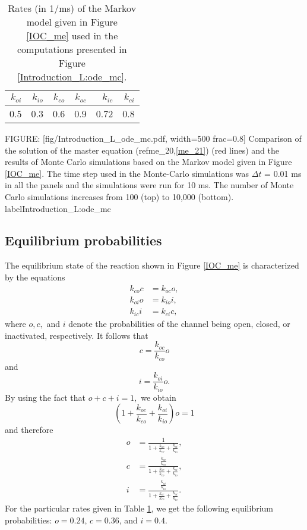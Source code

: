 \begin{table}  \begin{center}
\begin{tabular}{|r|r|r|r|r|r|} \hline
$k_{oi}$ & $k_{io}$ & $k_{co}$ & $k_{oc}$ & $k_{ic}$ &$k_{ci}$  \\ \hline
0.5  &    0.3 &   0.6   &  0.9  &   0.72  & 0.8 \\ \hline
\end{tabular} \end{center}
\caption{Rates (in 1/ms) of the Markov model given in Figure  \ref{IOC_me} used in the computations presented in Figure \ref{Introduction_L:ode_mc}.}
 \label{tab:const3x3}  \end{table}



FIGURE: [fig/Introduction_L_ode_mc.pdf, width=500 frac=0.8]  Comparison of the solution of the master equation (ref{me_20},\ref{me_21}) (red lines) and the results of Monte Carlo simulations based on the Markov model given in Figure \ref{IOC_me}. The time step used in the Monte-Carlo simulations was $\Delta t$ = 0.01 ms in all the panels and the simulations were run for 10 ms. The number of Monte Carlo simulations increases from 100 (top) to 10,000 (bottom). label{Introduction_L:ode_mc}


\subsection{Equilibrium probabilities}
\label{eq_prob_ioc}

The equilibrium state of the
reaction shown in Figure  \ref{IOC_me} is characterized by the equations
\begin{align}
k_{co}c  &  =k_{oc}o, \nonumber\\
k_{oi}o  &  =k_{io}i, \label{me_eq_20}\\
k_{ic}i  &  =k_{ci}c, \nonumber
\end{align}
where $o,c,$ and $i$ denote the probabilities of the channel being open,
closed, or inactivated, respectively. It follows that
\[
c=\frac{k_{oc}}{k_{co}}o
\]
and
\[
i=\frac{k_{oi}}{k_{io}}o.
\]
By using the fact that $o+c+i=1,$ we obtain
\[
\left(  1+\frac{k_{oc}}{k_{co}}+\frac{k_{oi}}{k_{io}}\right)  o=1
\]
and therefore
\begin{align*}
o  &  =\frac{1}{1+\frac{k_{oc}}{k_{co}}+\frac{k_{oi}}{k_{io}}},\\
c  &  =\frac{\frac{k_{oc}}{k_{co}}}{1+\frac{k_{oc}}{k_{co}}+\frac{k_{oi}
}{k_{io}}},\\
i  &  =\frac{\frac{k_{oi}}{k_{io}}}{1+\frac{k_{oc}}{k_{co}}+\frac{k_{oi}
}{k_{io}}}.
\end{align*}
For the particular rates given in Table \ref{tab:const3x3}, we get the following equilibrium probabilities: $o=0.24,\, c=0.36$, and
$i=0.4$.

